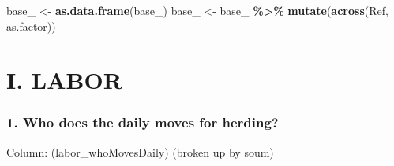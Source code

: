 \documentclass[
]{article}
\newenvironment{Shaded}{\begin{snugshade}}{\end{snugshade}}
\newcommand{\FunctionTok}[1]{\textcolor[rgb]{0.13,0.29,0.53}{\textbf{#1}}}
\newcommand{\NormalTok}[1]{#1}
\newcommand{\OtherTok}[1]{\textcolor[rgb]{0.56,0.35,0.01}{#1}}
\newcommand{\SpecialCharTok}[1]{\textcolor[rgb]{0.81,0.36,0.00}{\textbf{#1}}}
\begin{document}
\begin{Shaded}
\begin{Highlighting}[]
\NormalTok{base\_ }\OtherTok{\textless{}{-}} \FunctionTok{as.data.frame}\NormalTok{(base\_)}
\NormalTok{base\_ }\OtherTok{\textless{}{-}}\NormalTok{ base\_ }\SpecialCharTok{\%\textgreater{}\%} 
  \FunctionTok{mutate}\NormalTok{(}\FunctionTok{across}\NormalTok{(Ref, as.factor))}
\end{Highlighting}
\end{Shaded}

\section{I. LABOR}\label{i.-labor}

\subsubsection{1. Who does the daily moves for
herding?}\label{who-does-the-daily-moves-for-herding}

Column: (labor\_whoMovesDaily) (broken up by soum)
\end{document}
